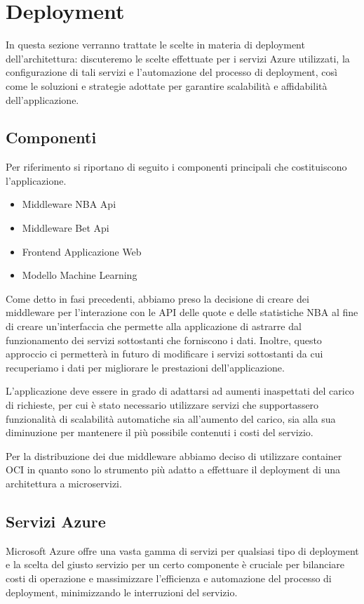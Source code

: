 \section{Deployment}
In questa sezione verranno trattate le scelte in materia di deployment dell'architettura: discuteremo le scelte effettuate per i servizi Azure utilizzati, la configurazione di tali servizi e l'automazione del processo di deployment, così come le soluzioni e strategie adottate per garantire scalabilità e affidabilità dell'applicazione.

\subsection{Componenti}
Per riferimento si riportano di seguito i componenti principali che costituiscono l'applicazione.
\begin{itemize}
    \item Middleware NBA Api
    \item Middleware Bet Api
    \item Frontend Applicazione Web
    \item Modello Machine Learning
\end{itemize}

Come detto in fasi precedenti, abbiamo preso la decisione di creare dei middleware per l'interazione con le API delle quote e delle statistiche NBA al fine di creare un'interfaccia che permette alla applicazione di astrarre dal funzionamento dei servizi sottostanti che forniscono i dati. Inoltre, questo approccio ci permetterà in futuro di modificare i servizi sottostanti da cui recuperiamo i dati per migliorare le prestazioni dell'applicazione.

L'applicazione deve essere in grado di adattarsi ad aumenti inaspettati del carico di richieste, per cui è stato necessario utilizzare servizi che supportassero funzionalità di scalabilità automatiche sia all'aumento del carico, sia alla sua diminuzione per mantenere il più possibile contenuti i costi del servizio.

Per la distribuzione dei due middleware abbiamo deciso di utilizzare container OCI in quanto sono lo strumento più adatto a effettuare il deployment di una architettura a microservizi.

\subsection{Servizi Azure}

Microsoft Azure offre una vasta gamma di servizi per qualsiasi tipo di deployment e la scelta del giusto servizio per un certo componente è cruciale per bilanciare costi di operazione e massimizzare l'efficienza e automazione del processo di deployment, minimizzando le interruzioni del servizio.


